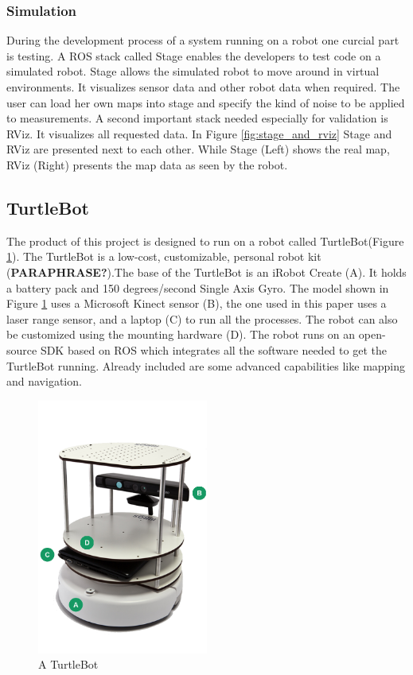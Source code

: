 \documentclass{ba-kecs}
\begin{document}
\subsubsection{Simulation}
During the development process of a system running on a robot one curcial part is testing. A ROS stack called Stage enables the developers to test code on a simulated robot. Stage allows the simulated robot to move around in virtual environments. It visualizes sensor data and other robot data when required. The user can load her own maps into stage and specify the kind of noise to be applied to measurements. A second important stack needed especially for validation is RViz. It visualizes all requested data. In Figure \ref{fig:stage_and_rviz} Stage and RViz are presented next to each other. While Stage (Left) shows the real map, RViz (Right) presents the map data as seen by the robot.

\subsection{TurtleBot}
 \label{subsec:turtle}

The product of this project is designed to run on a robot called TurtleBot(Figure \ref{fig:turtlebot}). The TurtleBot is a low-cost, customizable, personal robot kit (\textbf{PARAPHRASE?}).The base of the TurtleBot is an iRobot Create (A). It holds a battery pack and 150 degrees/second Single Axis Gyro. The model shown in Figure \ref{fig:turtlebot} uses a Microsoft Kinect sensor (B), the one used in this paper uses a laser range sensor, and a laptop (C) to run all the processes. The robot can also be customized using the mounting hardware (D). The robot runs on an open-source SDK based on ROS which integrates all the software needed to get the TurtleBot running. Already included are some advanced capabilities like mapping and navigation.
\begin{figure}[h]
	\centering
		\includegraphics[width=0.50\textwidth]{figures/turtlebot.png}
	\caption{A TurtleBot}
	\label{fig:turtlebot}
\end{figure}
\end{document}

